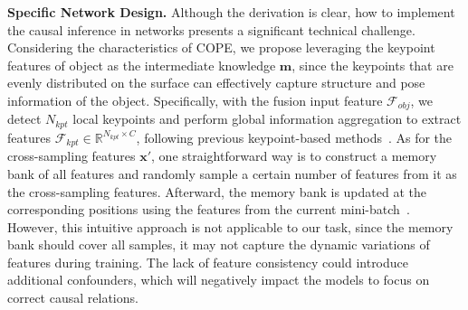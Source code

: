 \vspace{0.2cm}
\noindent
{\bf Specific Network Design.} Although the derivation is clear, how to implement the causal inference in networks presents a significant technical challenge. 
Considering the characteristics of COPE, we propose leveraging the keypoint features of object as the intermediate knowledge $\boldsymbol{m}$, since the keypoints that are evenly distributed on the surface can effectively capture structure and pose information of the object.
Specifically, with the fusion input feature $\mathcal{F}_{obj}$, we detect $N_{kpt}$ local keypoints and perform global information aggregation to extract features $\mathcal{F}_{kpt} \in \mathbb{R}^{N_{kpt} \times C}$, following previous keypoint-based methods~\cite{lin2024instance,liu2023net}.
As for the cross-sampling features $\boldsymbol{x'}$, one straightforward way is to construct a memory bank of all features and randomly sample a certain number of features from it as the cross-sampling features. Afterward, the memory bank is updated at the corresponding positions using the features from the current mini-batch~\cite{wu2018unsupervised}. However, this intuitive approach is not applicable to our task, since the memory bank should cover all samples, it may not capture the dynamic variations of features during training. The lack of feature consistency could introduce additional confounders, which will negatively impact the models to focus on correct causal relations.

